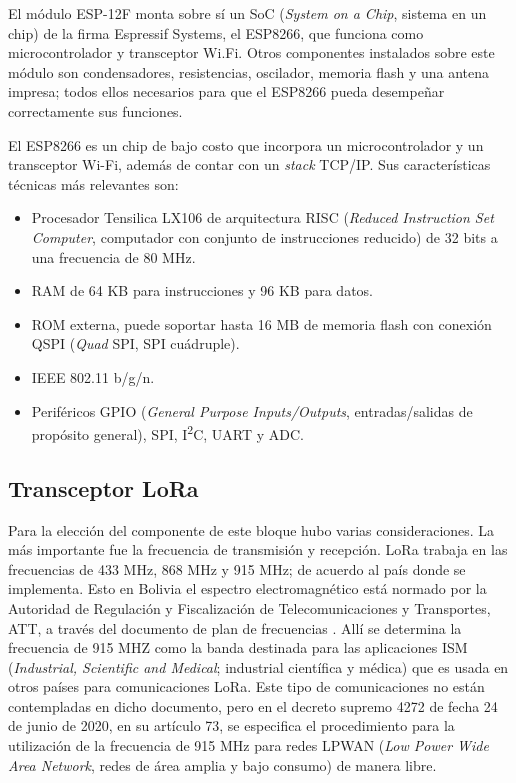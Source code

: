 
El módulo ESP-12F monta sobre sí un SoC (\textit{System on a Chip}, sistema en un chip) de la firma Espressif Systems, el ESP8266, que funciona como microcontrolador y transceptor Wi.Fi. Otros componentes instalados sobre este módulo son condensadores, resistencias, oscilador, memoria flash y una antena impresa; todos ellos necesarios para que el ESP8266 pueda desempeñar correctamente sus funciones.

El ESP8266 es un chip de bajo costo que incorpora un microcontrolador y un transceptor Wi-Fi, además de contar con un \textit{stack} TCP/IP. Sus características técnicas más relevantes son:
\begin{itemize}
	\item Procesador Tensilica LX106 de arquitectura RISC (\textit{Reduced Instruction Set Computer}, computador con conjunto de instrucciones reducido) de 32 bits a una frecuencia de 80 MHz.
	\item RAM de 64 KB para instrucciones y 96 KB para datos.
	\item ROM externa, puede soportar hasta 16 MB de memoria flash con conexión QSPI (\textit{Quad} SPI, SPI cuádruple).
	\item IEEE 802.11 b/g/n.
	\item Periféricos GPIO (\textit{General Purpose Inputs/Outputs}, entradas/salidas de propósito general), SPI, I\textsuperscript{2}C, UART y ADC.
\end{itemize}

\subsection{Transceptor LoRa}

Para la elección del componente de este bloque hubo varias consideraciones. La más importante fue la frecuencia de transmisión y recepción. LoRa trabaja en las frecuencias de 433 MHz, 868 MHz y 915 MHz; de acuerdo al país donde se implementa. Esto en Bolivia el espectro electromagnético está normado por la Autoridad de Regulación y Fiscalización de Telecomunicaciones y Transportes, ATT, a través del documento de plan de frecuencias \citep{WEBSITE:17}. Allí se determina la frecuencia de 915 MHZ como la banda destinada para las aplicaciones ISM (\textit{Industrial, Scientific and Medical}; industrial científica y médica) que es usada en otros países para comunicaciones LoRa. Este tipo de comunicaciones no están contempladas en dicho documento, pero en el decreto supremo 4272 de fecha 24 de junio de 2020, en su artículo 73\citep{WEBSITE:27}, se especifica el procedimiento para la utilización de la frecuencia de 915 MHz para redes LPWAN (\textit{Low Power Wide Area Network}, redes de área amplia y bajo consumo) de manera libre.

